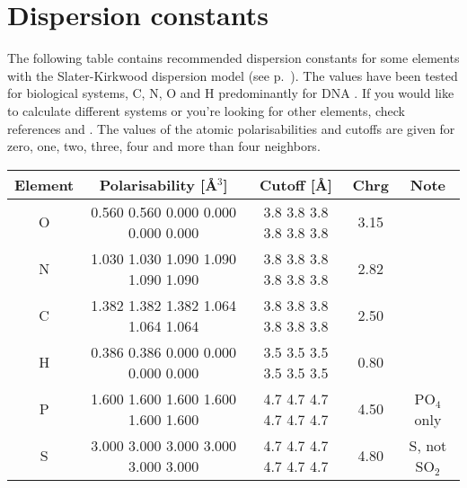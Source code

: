 \chapter{Dispersion constants}
\label{app:dispconsts}

The following table contains recommended dispersion constants for some elements
with the Slater-Kirkwood dispersion model (see
p.~). The values have been tested for biological
systems, C, N, O and H predominantly for DNA \cite{elstner-jcp-114-5149}. If you
would like to calculate different systems or you're looking for other elements,
check references \cite{miller-JAmChemSoc-112-8533} and
\cite{kang-TheorChimActa-61-41}. The values of the atomic polarisabilities and
cutoffs are given for zero, one, two, three, four and more than four neighbors.

\begin{center}
\begin{tabular}{|c|c|c|c|c|} \hline
Element & Polarisability [\AA$^3$] & Cutoff [\AA] & Chrg & Note \\
\hline
O & 0.560 0.560 0.000 0.000 0.000 0.000 & 3.8 3.8 3.8 3.8 3.8 3.8 &
3.15 & \\
N & 1.030 1.030 1.090 1.090 1.090 1.090 & 3.8 3.8 3.8 3.8 3.8 3.8 &
2.82 & \\
C & 1.382 1.382 1.382 1.064 1.064 1.064 & 3.8 3.8 3.8 3.8 3.8 3.8 &
2.50 & \\
H & 0.386 0.386 0.000 0.000 0.000 0.000 & 3.5 3.5 3.5 3.5 3.5 3.5 &
0.80 & \\
P & 1.600 1.600 1.600 1.600 1.600 1.600 & 4.7 4.7 4.7 4.7 4.7 4.7 &
4.50 & PO$_4$ only \\
S & 3.000 3.000 3.000 3.000 3.000 3.000 & 4.7 4.7 4.7 4.7 4.7 4.7 &
4.80 & S, not SO$_2$ \\
\hline
\end{tabular}
\end{center}

